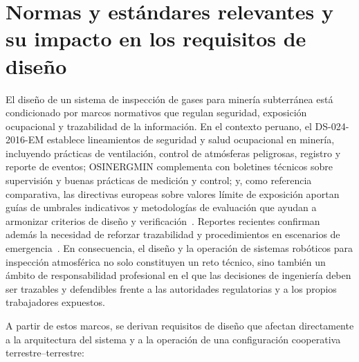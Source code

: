 \section{Normas y estándares relevantes y su impacto en los requisitos de diseño}

El diseño de un sistema de inspección de gases para minería subterránea está condicionado por marcos normativos que regulan seguridad, exposición ocupacional y trazabilidad de la información. En el contexto peruano, el DS-024-2016-EM establece lineamientos de seguridad y salud ocupacional en minería, incluyendo prácticas de ventilación, control de atmósferas peligrosas, registro y reporte de eventos; OSINERGMIN complementa con boletines técnicos sobre supervisión y buenas prácticas de medición y control; y, como referencia comparativa, las directivas europeas sobre valores límite de exposición aportan guías de umbrales indicativos y metodologías de evaluación que ayudan a armonizar criterios de diseño y verificación~\cite{MINEM_DS024_2016,OSINERGMIN_BoletinGSM_2020b,EU_ExposureDirective_2020}. Reportes recientes confirman además la necesidad de reforzar trazabilidad y procedimientos en escenarios de emergencia~\cite{MINEM_Yanaquihua_2023}. En consecuencia, el diseño y la operación de sistemas robóticos para inspección atmosférica no solo constituyen un reto técnico, sino también un ámbito de responsabilidad profesional en el que las decisiones de ingeniería deben ser trazables y defendibles frente a las autoridades regulatorias y a los propios trabajadores expuestos.


A partir de estos marcos, se derivan requisitos de diseño que afectan directamente a la arquitectura del sistema y a la operación de una configuración cooperativa terrestre--terrestre:

